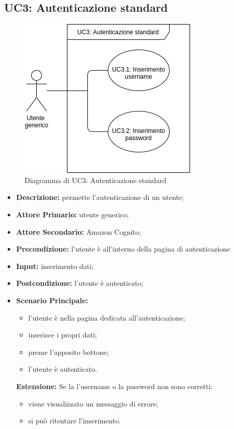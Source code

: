 \subsection{UC3: Autenticazione standard}
\begin{figure}[!ht]
    \caption{Diagramma di UC3: Autenticazione standard}
    \vspace{10px}
    \includegraphics[scale=0.5]{../../../Images/AnalisiRequisiti/UC03}
    \centering
\end{figure}
\label{sec:UC3}
\begin{itemize}
    \item \textbf{Descrizione:} permette l'autenticazione di un utente;
    \item \textbf{Attore Primario:} utente generico;
    \item \textbf{Attore Secondario:} Amazon Cognito;
    \item \textbf{Precondizione:} l'utente è all'interno della pagina di autenticazione
    \item \textbf{Input:} inserimento dati;
    \item \textbf{Postcondizione:} l'utente è autenticato;
    \item \textbf{Scenario Principale:} 
    \begin{itemize}
        \item l'utente è nella pagina dedicata all'autenticazione;
        \item inserisce i propri dati;
        \item preme l'apposito bottone;
        \item l'utente è autenticato.
    \end{itemize}
    \textbf{Estensione:}
        Se la l'username o la password non sono corretti:
        \begin{itemize}
            \item viene visualizzato un messaggio di errore;
            \item si può ritentare l'inserimento.
        \end{itemize}
\end{itemize}
